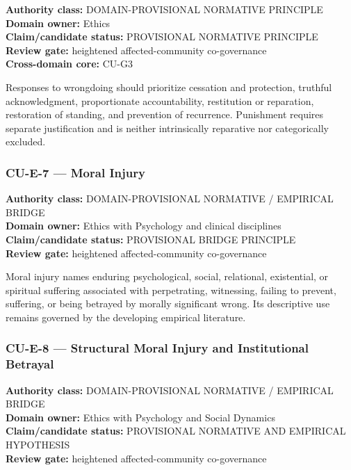 \documentclass[
  11pt,
]{article}
\begin{document}
\textbf{Authority class:} DOMAIN-PROVISIONAL NORMATIVE PRINCIPLE\\
\textbf{Domain owner:} Ethics\\
\textbf{Claim/candidate status:} PROVISIONAL NORMATIVE PRINCIPLE\\
\textbf{Review gate:} heightened affected-community co-governance\\
\textbf{Cross-domain core:} CU-G3

Responses to wrongdoing should prioritize cessation and protection,
truthful acknowledgment, proportionate accountability, restitution or
reparation, restoration of standing, and prevention of recurrence.
Punishment requires separate justification and is neither intrinsically
reparative nor categorically excluded.

\subsubsection{CU-E-7 --- Moral Injury}\label{cu-e-7-moral-injury}

\textbf{Authority class:} DOMAIN-PROVISIONAL NORMATIVE / EMPIRICAL
BRIDGE\\
\textbf{Domain owner:} Ethics with Psychology and clinical disciplines\\
\textbf{Claim/candidate status:} PROVISIONAL BRIDGE PRINCIPLE\\
\textbf{Review gate:} heightened affected-community co-governance

Moral injury names enduring psychological, social, relational,
existential, or spiritual suffering associated with perpetrating,
witnessing, failing to prevent, suffering, or being betrayed by morally
significant wrong. Its descriptive use remains governed by the
developing empirical literature.

\subsubsection{CU-E-8 --- Structural Moral Injury and Institutional
Betrayal}\label{cu-e-8-structural-moral-injury-and-institutional-betrayal}

\textbf{Authority class:} DOMAIN-PROVISIONAL NORMATIVE / EMPIRICAL
BRIDGE\\
\textbf{Domain owner:} Ethics with Psychology and Social Dynamics\\
\textbf{Claim/candidate status:} PROVISIONAL NORMATIVE AND EMPIRICAL
HYPOTHESIS\\
\textbf{Review gate:} heightened affected-community co-governance
\end{document}
